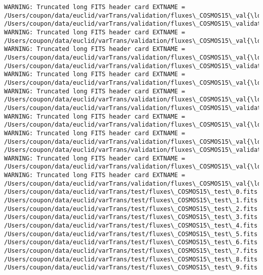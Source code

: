 \documentclass[11pt]{article}
\begin{document}
\begin{Verbatim}[commandchars=\\\{\}]
WARNING: Truncated long FITS header card EXTNAME = /Users/coupon/data/euclid/varTrans/validation/fluxes\_COSMOS15\_val{\ldots}
/Users/coupon/data/euclid/varTrans/validation/fluxes\_COSMOS15\_validation\_6.fits
WARNING: Truncated long FITS header card EXTNAME = /Users/coupon/data/euclid/varTrans/validation/fluxes\_COSMOS15\_val{\ldots}
WARNING: Truncated long FITS header card EXTNAME = /Users/coupon/data/euclid/varTrans/validation/fluxes\_COSMOS15\_val{\ldots}
/Users/coupon/data/euclid/varTrans/validation/fluxes\_COSMOS15\_validation\_7.fits
WARNING: Truncated long FITS header card EXTNAME = /Users/coupon/data/euclid/varTrans/validation/fluxes\_COSMOS15\_val{\ldots}
WARNING: Truncated long FITS header card EXTNAME = /Users/coupon/data/euclid/varTrans/validation/fluxes\_COSMOS15\_val{\ldots}
/Users/coupon/data/euclid/varTrans/validation/fluxes\_COSMOS15\_validation\_8.fits
WARNING: Truncated long FITS header card EXTNAME = /Users/coupon/data/euclid/varTrans/validation/fluxes\_COSMOS15\_val{\ldots}
WARNING: Truncated long FITS header card EXTNAME = /Users/coupon/data/euclid/varTrans/validation/fluxes\_COSMOS15\_val{\ldots}
/Users/coupon/data/euclid/varTrans/validation/fluxes\_COSMOS15\_validation\_9.fits
WARNING: Truncated long FITS header card EXTNAME = /Users/coupon/data/euclid/varTrans/validation/fluxes\_COSMOS15\_val{\ldots}
WARNING: Truncated long FITS header card EXTNAME = /Users/coupon/data/euclid/varTrans/validation/fluxes\_COSMOS15\_val{\ldots}
/Users/coupon/data/euclid/varTrans/test/fluxes\_COSMOS15\_test\_0.fits
/Users/coupon/data/euclid/varTrans/test/fluxes\_COSMOS15\_test\_1.fits
/Users/coupon/data/euclid/varTrans/test/fluxes\_COSMOS15\_test\_2.fits
/Users/coupon/data/euclid/varTrans/test/fluxes\_COSMOS15\_test\_3.fits
/Users/coupon/data/euclid/varTrans/test/fluxes\_COSMOS15\_test\_4.fits
/Users/coupon/data/euclid/varTrans/test/fluxes\_COSMOS15\_test\_5.fits
/Users/coupon/data/euclid/varTrans/test/fluxes\_COSMOS15\_test\_6.fits
/Users/coupon/data/euclid/varTrans/test/fluxes\_COSMOS15\_test\_7.fits
/Users/coupon/data/euclid/varTrans/test/fluxes\_COSMOS15\_test\_8.fits
/Users/coupon/data/euclid/varTrans/test/fluxes\_COSMOS15\_test\_9.fits

    \end{Verbatim}
\end{document}

